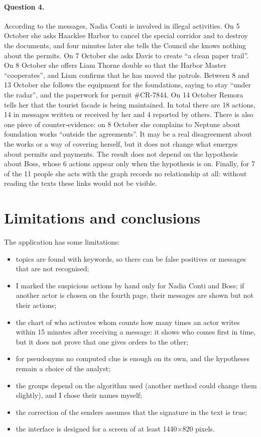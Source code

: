 \documentclass[11pt,a4paper]{article}
\begin{document}
\paragraph{Question 4.} According to the messages, Nadia Conti is involved in illegal activities. On 5 October she asks
Haacklee Harbor to cancel the special corridor and to destroy the documents, and four minutes later she tells the
Council she knows nothing about the permits. On 7 October she asks Davis to create ``a clean paper trail''. On 8 October
she offers Liam Thorne double so that the Harbor Master ``cooperates'', and Liam confirms that he has moved the patrols.
Between 8 and 13 October she follows the equipment for the foundations, saying to stay ``under the radar'', and the
paperwork for permit \#CR-7844. On 14 October Remora tells her that the tourist facade is being maintained. In total
there are 18 actions, 14 in messages written or received by her and 4 reported by others. There is also one piece of
counter-evidence: on 8 October she complains to Neptune about foundation works ``outside the agreements''. It may be a
real disagreement about the works or a way of covering herself, but it does not change what emerges about permits and
payments. The result does not depend on the hypothesis about Boss, whose 6 actions appear only when the hypothesis is
on. Finally, for 7 of the 11 people she acts with the graph records no relationship at all: without reading the texts
these links would not be visible.

\section{Limitations and conclusions}
The application has some limitations:
\begin{itemize}
  \item topics are found with keywords, so there can be false positives or messages that are not recognised;
  \item I marked the suspicious actions by hand only for Nadia Conti and Boss; if another actor is chosen on the fourth
        page, their messages are shown but not their actions;
  \item the chart of who activates whom counts how many times an actor writes within 15 minutes after receiving a
        message: it shows who comes first in time, but it does not prove that one gives orders to the other;
  \item for pseudonyms no computed clue is enough on its own, and the hypotheses remain a choice of the analyst;
  \item the groups depend on the algorithm used (another method could change them slightly), and I chose their names myself;
  \item the correction of the senders assumes that the signature in the text is true;
  \item the interface is designed for a screen of at least 1440$\times$820 pixels.
\end{itemize}
\end{document}
